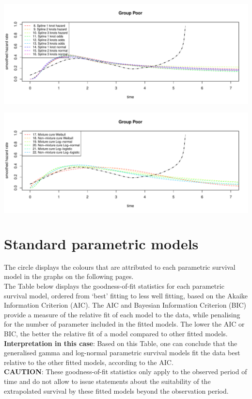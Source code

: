\documentclass[]{article}
\begin{document}
\begin{flushleft}\includegraphics[height=0.29\textheight]{Images/plot_haz_pred-8} \end{flushleft}

\begin{flushleft}\includegraphics[height=0.29\textheight]{Images/plot_haz_pred-9} \end{flushleft}

\newpage

\section{Standard parametric models}\label{standard-parametric-models}

The circle displays the colours that are attributed to each parametric
survival model in the graphs on the following pages.\\
The Table below displays the goodness-of-fit statistics for each
parametric survival model, ordered from `best' fitting to less well
fitting, based on the Akaike Information Criterion (AIC). The AIC and
Bayesian Information Criterion (BIC) provide a measure of the relative
fit of each model to the data, while penalising for the number of
parameter included in the fitted models. The lower the AIC or BIC, the
better the relative fit of a model compared to other fitted models.\\
\textbf{Interpretation in this case}: Based on this Table, one can
conclude that the generalised gamma and log-normal parametric survival
models fit the data best relative to the other fitted models, according
to the AIC.\\
\textbf{CAUTION}: These goodness-of-fit statistics only apply to the
observed period of time and do not allow to issue statements about the
suitability of the extrapolated survival by these fitted models beyond
the observation period.
\end{document}
